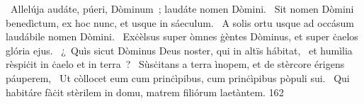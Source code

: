 {~Allelúja}
{%
audáte, púeri, Dòminum~; laudáte nomen Dòmini.
~Sit nomen Dòmini benedìctum, ex hoc nunc, et usque in sáeculum.
~A solis ortu usque ad occásum laudábile nomen Dòmini.
~Exċèlsus super òmnes ġèntes Dòminus, et super ċaelos glória ejus.
~¿~Quìs sicut Dòminus Deus noster, qui in altïs hábitat,
~et humìlia rèspiċit in ċaelo et in terra~?
~Sùsċitans a terra ìnopem, et de stèrcore érigens páuperem,
~Ut còllocet eum cum prinċìpibus, cum prinċìpibus pòpuli sui.
~Qui habitáre fàċit stèrilem in domu, matrem filiórum laetàntem.
}
{16}{2}
